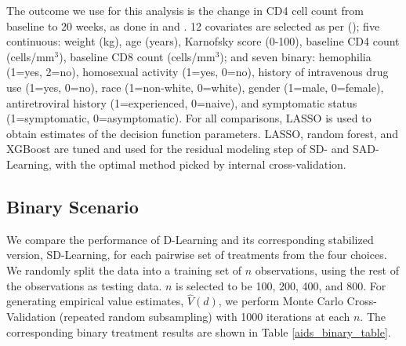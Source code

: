 \documentclass[useAMS,usenatbib]{biom}
\begin{document}
The outcome we use for this analysis is the change in CD4 cell count from baseline to 20 weeks, as done in \cite{qi_d-learning_2018} and \cite{qi_multi-armed_2020}. 12 covariates are selected as per (\cite{fan_concordance-assisted_2017}); five continuous: weight (kg), age (years), Karnofsky score (0-100), baseline CD4 count (cells/mm$^3$), baseline CD8 count (cells/mm$^3$); and seven binary: hemophilia (1=yes, 2=no), homosexual activity (1=yes, 0=no), history of intravenous drug use (1=yes, 0=no), race (1=non-white, 0=white), gender (1=male, 0=female), antiretroviral history (1=experienced, 0=naive), and symptomatic status (1=symptomatic, 0=asymptomatic). For all comparisons, LASSO is used to obtain estimates of the decision function parameters. LASSO, random forest, and XGBoost are tuned and used for the residual modeling step of SD- and SAD-Learning, with the optimal method picked by internal cross-validation. 



\subsection{Binary Scenario} \label{subsec_data_binary}

We compare the performance of D-Learning and its corresponding stabilized version, SD-Learning, for each pairwise set of treatments from the four choices. We randomly split the data into a training set of $n$ observations, using the rest of the observations as testing data. $n$ is selected to be 100, 200, 400, and 800. For generating empirical value estimates, $\hat{V}(d)$, we perform Monte Carlo Cross-Validation (repeated random subsampling) with 1000 iterations at each $n$. The corresponding binary treatment results are shown in Table \ref{aids_binary_table}.
\end{document}
